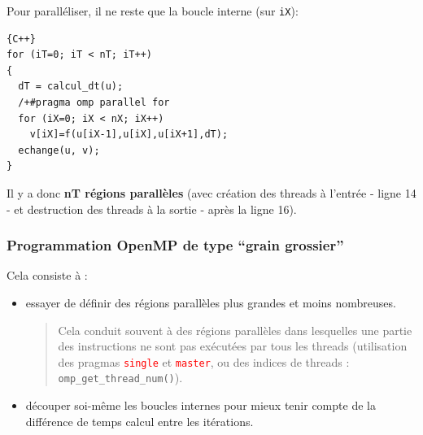 \documentclass{beamer}
\begin{document}
\begin{frame}[fragile]
Pour paralléliser, il ne reste que la boucle interne (sur \verb|iX|):


\begin{lstlisting}{C++}
for (iT=0; iT < nT; iT++)
{
  dT = calcul_dt(u);
  /+#pragma omp parallel for
  for (iX=0; iX < nX; iX++)
    v[iX]=f(u[iX-1],u[iX],u[iX+1],dT);
  echange(u, v);
}
\end{lstlisting}

\vfill
Il y a donc {\bf nT régions parallèles} (avec création des threads à l'entrée - ligne 14 - et destruction des threads à la sortie - après la ligne 16).
\vfill
\end{frame}

\begin{frame}[fragile]
	\frametitle{Programmation OpenMP de type ``grain grossier''}

\vfill
Cela consiste à :
\medskip

\begin{itemize}
	\item 
	essayer de définir des régions parallèles plus grandes et moins nombreuses.
\vfill

\begin{quote}
	Cela conduit souvent à des régions parallèles dans lesquelles une partie des instructions ne sont pas exécutées par tous les threads (utilisation des pragmas \textcolor{red}{\tt single} et \textcolor{red}{\tt master}, ou des indices de threads : {\tt omp\_get\_thread\_num()}).
\end{quote}

	\item découper soi-même les boucles internes pour mieux tenir compte de la différence de temps calcul entre les itérations.
\end{itemize}

\vfill
\end{frame}
\end{document}
